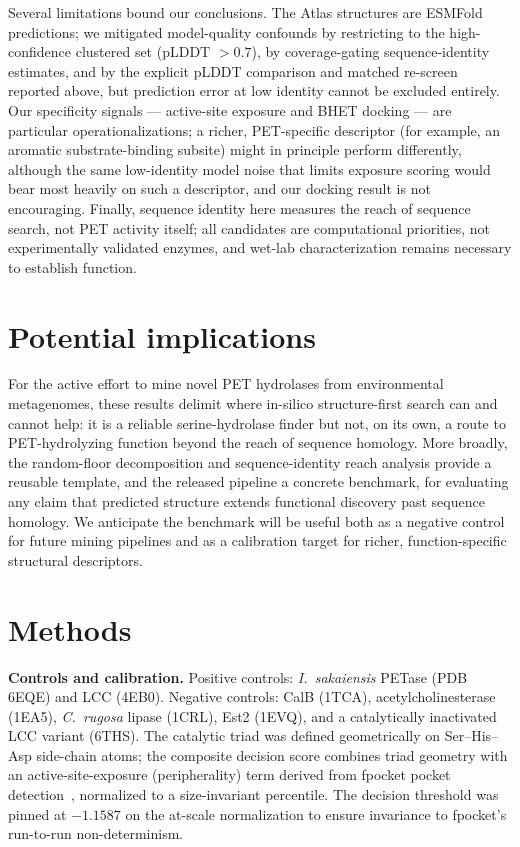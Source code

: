 \documentclass[10pt]{article}
\begin{document}
Several limitations bound our conclusions. The Atlas structures are ESMFold predictions; we mitigated model-quality confounds by restricting to the high-confidence clustered set (pLDDT $> 0.7$), by coverage-gating sequence-identity estimates, and by the explicit pLDDT comparison and matched re-screen reported above, but prediction error at low identity cannot be excluded entirely. Our specificity signals --- active-site exposure and BHET docking --- are particular operationalizations; a richer, PET-specific descriptor (for example, an aromatic substrate-binding subsite) might in principle perform differently, although the same low-identity model noise that limits exposure scoring would bear most heavily on such a descriptor, and our docking result is not encouraging. Finally, sequence identity here measures the reach of sequence search, not PET activity itself; all candidates are computational priorities, not experimentally validated enzymes, and wet-lab characterization remains necessary to establish function.

\section{Potential implications}
For the active effort to mine novel PET hydrolases from environmental metagenomes, these results delimit where in-silico structure-first search can and cannot help: it is a reliable serine-hydrolase finder but not, on its own, a route to PET-hydrolyzing function beyond the reach of sequence homology. More broadly, the random-floor decomposition and sequence-identity reach analysis provide a reusable template, and the released pipeline a concrete benchmark, for evaluating any claim that predicted structure extends functional discovery past sequence homology. We anticipate the benchmark will be useful both as a negative control for future mining pipelines and as a calibration target for richer, function-specific structural descriptors.

\section{Methods}
\noindent\textbf{Controls and calibration.} Positive controls: \emph{I.\ sakaiensis} PETase (PDB 6EQE) and LCC (4EB0). Negative controls: CalB (1TCA), acetylcholinesterase (1EA5), \emph{C.\ rugosa} lipase (1CRL), Est2 (1EVQ), and a catalytically inactivated LCC variant (6THS). The catalytic triad was defined geometrically on Ser--His--Asp side-chain atoms; the composite decision score combines triad geometry with an active-site-exposure (peripherality) term derived from fpocket pocket detection~\cite{leguilloux2009}, normalized to a size-invariant percentile. The decision threshold was pinned at $-1.1587$ on the at-scale normalization to ensure invariance to fpocket's run-to-run non-determinism.
\end{document}
